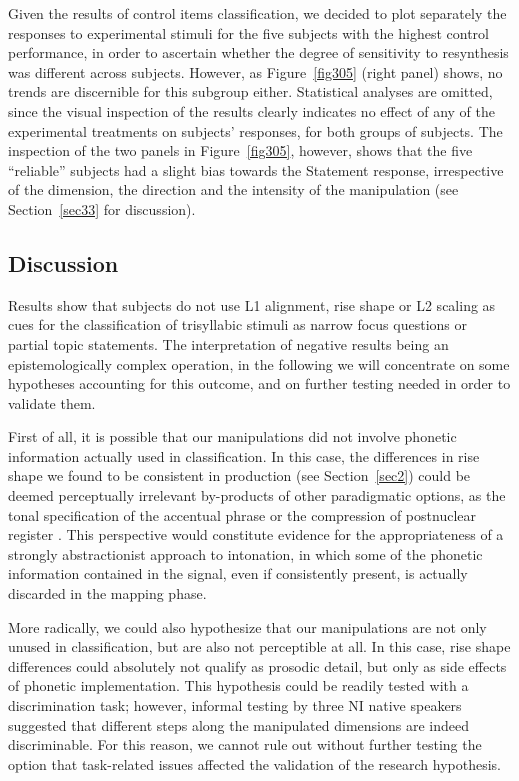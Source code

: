 Given the results of control items classification, we decided to plot separately the responses to experimental stimuli for the five subjects with the highest control performance, in order to ascertain whether the degree of sensitivity to resynthesis was different across subjects. However, as Figure~\ref{fig305} (right panel) shows, no trends are discernible for this subgroup either. Statistical analyses are omitted, since the visual inspection of the results clearly indicates no effect of any of the experimental treatments on subjects' responses, for both groups of subjects. The inspection of the two panels in Figure~\ref{fig305}, however, shows that the five ``reliable'' subjects had a slight bias towards the Statement response, irrespective of the dimension, the direction and the intensity of the manipulation (see Section~\ref{sec33} for discussion).

\subsection{Discussion}\label{sec323}
Results show that subjects do not use L1 alignment, rise shape or L2 scaling as cues for the classification of trisyllabic stimuli as narrow focus questions or partial topic statements. The interpretation of negative results being an epistemologically complex operation, in the following we will concentrate on some hypotheses accounting for this outcome, and on further testing needed in order to validate them.

First of all, it is possible that our manipulations did not involve phonetic information actually used in classification. In this case, the differences in rise shape we found to be consistent in production (see Section~\ref{sec2}) could be deemed perceptually irrelevant by-products of other paradigmatic options, as the tonal specification of the accentual phrase \citep{petrone2008tonal} or the compression of postnuclear register \citep{dimperio2011phrasing}. This perspective would constitute evidence for the appropriateness of a strongly abstractionist approach to intonation, in which some of the phonetic information contained in the signal, even if consistently present, is actually discarded in the mapping phase.

More radically, we could also hypothesize that our manipulations are not only unused in classification, but are also not perceptible at all. In this case, rise shape differences could absolutely not qualify as prosodic detail, but only as side effects of phonetic implementation. This hypothesis could be readily tested with a discrimination task; however, informal testing by three NI native speakers suggested that different steps along the manipulated dimensions are indeed discriminable. For this reason, we cannot rule out without further testing the option that task-related issues affected the validation of the research hypothesis. 

